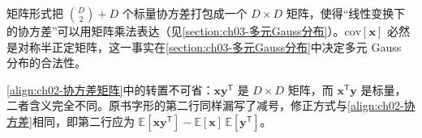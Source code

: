 \documentclass[../../main.tex]{subfiles}
\begin{document}
\begin{remark}
矩阵形式把 $\binom{D}{2}+D$ 个标量协方差打包成一个 $D\times D$ 矩阵，使得“线性变换下的协方差”可以用矩阵乘法表达（见\cref{section:ch03-多元Gauss分布}）。$\mathrm{cov}[\mathbf{x}]$ 必然是对称半正定矩阵，这一事实在\cref{section:ch03-多元Gauss分布}中决定多元 Gauss 分布的合法性。

\eqref{align:ch02-协方差矩阵}中的转置不可省：$\mathbf{x}\mathbf{y}^{\mathsf{T}}$ 是 $D\times D$ 矩阵，而 $\mathbf{x}^{\mathsf{T}}\mathbf{y}$ 是标量，二者含义完全不同。原书字形的第二行同样漏写了减号，修正方式与\eqref{align:ch02-协方差}相同，即第二行应为 $\mathbb{E}[\mathbf{x}\mathbf{y}^{\mathsf{T}}]-\mathbb{E}[\mathbf{x}]\,\mathbb{E}[\mathbf{y}^{\mathsf{T}}]$。
\end{remark}
\end{document}
